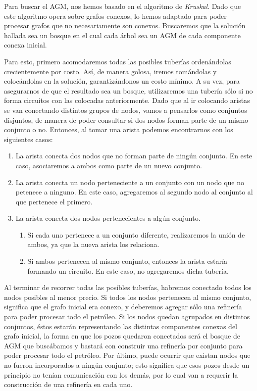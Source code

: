 Para buscar el AGM, nos hemos basado en el algoritmo de {\it Kruskal}.  Dado que este algoritmo opera sobre grafos conexos, lo hemos adaptado para poder procesar grafos que no necesariamente son conexos. Buscaremos que la solución hallada sea un bosque en el cual cada árbol sea un AGM de cada componente conexa inicial.

Para esto, primero acomodaremos todas las posibles tuberías ordenándolas crecientemente por costo. Así, de manera golosa, iremos tomándolas y colocándolas en la solución, garantizándonos un costo mínimo. A su vez, para asegurarnos de que el resultado sea un bosque, utilizaremos una tubería sólo si no forma circuitos con las colocadas anteriormente. Dado que al ir colocando aristas se van conectando distintos grupos de nodos, vamos a pensarlos como conjuntos disjuntos, de manera de poder consultar si dos nodos forman parte de un mismo conjunto o no.  Entonces, al tomar una arista podemos encontrarnos con los siguientes casos:

\begin{enumerate}
	\item La arista conecta dos nodos que no forman parte de ningún conjunto.  En este caso, asociaremos a ambos como parte de un nuevo conjunto.
	\item La arista conecta un nodo perteneciente a un conjunto con un nodo que no petenece a ninguno.  En este caso, agregaremos al segundo nodo al conjunto al que pertenece el primero.
	\item La arista conecta dos nodos pertenecientes a algún conjunto.
	
	\begin{enumerate}
		\item Si cada uno pertenece a un conjunto diferente, realizaremos la unión de ambos, ya que la nueva arista los relaciona.
		\item Si ambos pertenecen al mismo conjunto, entonces la arista estaría formando un circuito.  En este caso, no agregaremos dicha tubería.
	\end{enumerate}
\end{enumerate}

Al terminar de recorrer todas las posibles tuberías, habremos conectado todos los nodos posibles al menor precio.  Si todos los nodos pertenecen al mismo conjunto, significa que el grafo inicial era conexo, y deberemos agregar sólo una refinería para poder procesar todo el petróleo.  Si los nodos quedan agrupados en distintos conjuntos, éstos estarán representando las distintas componentes conexas del grafo inicial, la forma en que los pozos quedaron conectados será el bosque de AGM que buscábamos y bastará con construir una refinería por conjunto para poder procesar todo el petróleo.  Por último, puede ocurrir que existan nodos que no fueron incorporados a ningún conjunto; esto significa que esos pozos desde un principio no tenían comunicación con los demás, por lo cual van a requerir la construcción de una refinería en cada uno.

